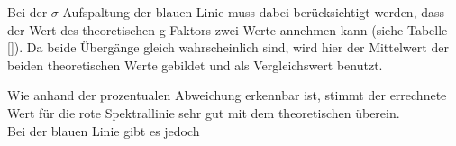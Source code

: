Bei der  $\sigma$-Aufspaltung der blauen Linie muss dabei berücksichtigt werden, dass der Wert des theoretischen g-Faktors zwei Werte annehmen kann (siehe Tabelle \ref{}). Da beide Übergänge gleich wahrscheinlich sind, wird hier der Mittelwert der beiden theoretischen Werte gebildet und als Vergleichswert benutzt.

Wie anhand der prozentualen Abweichung erkennbar ist, stimmt der errechnete Wert für die rote Spektrallinie sehr gut mit dem theoretischen überein.\\
Bei der blauen Linie gibt es jedoch




